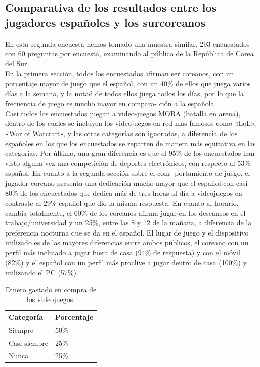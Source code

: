 \documentclass[a4paper,11pt]{article}
\begin{document}
\subsection{Comparativa de los resultados entre los jugadores españoles y los surcoreanos}
En esta segunda encuesta hemos tomado una muestra similar, 293 encuestados con 60 preguntas por encuesta, examinando al público de la República de Corea del Sur.\\
En la primera sección, todos los encuestados afirman ser coreanos, con un porcentaje mayor de juego que el español, con un 40\% de ellos que juega varios días a la semana, y la mitad de todos ellos juega todos los días, por lo que la frecuencia de juego es mucho mayor en compara- ción a la española.\\
Casi todos los encuestados juegan a video-juegos MOBA (batalla en arena), dentro de los cuales se incluyen los videojuegos en red más famosos como «LoL», «War of Warcraft», y las otras categorías son ignoradas, a diferencia de los españoles en los que los encuestados se reparten de manera más equitativa en las categorías. Por último, una gran diferencia es que el 95\% de los encuestados han visto alguna vez una competición de deportes electrónicos, con respecto al 53\% español. En cuanto a la segunda sección sobre el com- portamiento de juego, el jugador coreano presenta una dedicación mucho mayor que el español con casi 80\% de los encuestados que dedica más de tres horas al día a videojuegos en contraste al 29\% español que dio la misma respuesta. En cuanto al horario, cambia totalmente, el 60\% de los coreanos afirma jugar en los descansos en el trabajo/universidad y un 25\%, entre las 8 y 12 de la mañana, a diferencia de la preferencia nocturna que se da en el español. El lugar de juego y el dispositivo utilizado es de las mayores diferencias entre ambos públicos, el coreano con un perfil más inclinado a jugar fuera de casa (94\% de respuesta) y con el móvil (82\%) y el español con un perfil más proclive a jugar dentro de casa (100\%) y utilizando el PC (57\%).

\begin{table}[htbp]
\begin{center}
\begin{tabular}{|l|l|}
\hline
Categoría & Porcentaje \\
\hline 
\hline Siempre & 50\% \\ 
\hline Casi siempre & 25\% \\ 
\hline Nunca & 25\% \\ 
\hline
\end{tabular}
\caption{Dinero gastado en compra de los videojuegos.}
\label{tabla:sencilla}
\end{center}
\end{table}
\end{document}
